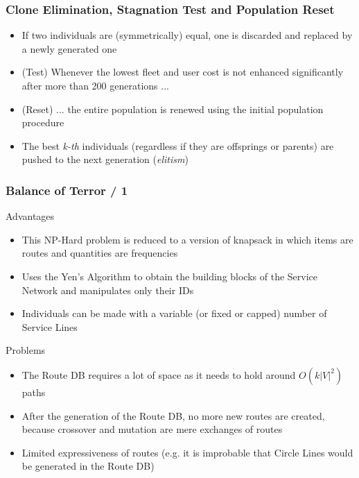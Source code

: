 \documentclass[dvipsnames]{beamer}
\begin{document}
\begin{frame}
  \frametitle{Clone Elimination, Stagnation Test and Population Reset}
  \begin{itemize}
    \item If two individuals are (symmetrically) equal, one is discarded and replaced by a newly generated one
    \item (Test) Whenever the lowest fleet and user cost is not enhanced significantly after more than 200 generations ...
    \item (Reset) ... the entire population is renewed using the initial population procedure
    \item The best \textit{k-th} individuals (regardless if they are offsprings or parents) are pushed to the next generation (\textit{elitism})
  \end{itemize}
\end{frame}

\begin{frame}
  \frametitle{Balance of Terror / 1}
  \begin{exampleblock}{Advantages}
    \begin{itemize}
      \item This NP-Hard problem is reduced to a version of knapsack in which items are routes and quantities are frequencies
      \item Uses the Yen's Algorithm to obtain the building blocks of the Service Network and manipulates only their IDs
      \item Individuals can be made with a variable (or fixed or capped) number of Service Lines
    \end{itemize}
  \end{exampleblock}

  \begin{alertblock}{Problems}
    \begin{itemize}
      \item The Route DB requires a lot of space as it needs to hold around $O(k|V|^2)$ paths
      \item After the generation of the Route DB, no more new routes are created, because crossover and mutation are mere exchanges of routes
      \item Limited expressiveness of routes (e.g. it is improbable that Circle Lines would be generated in the Route DB)
    \end{itemize}
  \end{alertblock}
\end{frame}
\end{document}
